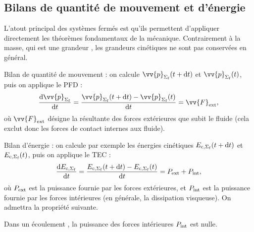 \documentclass[12pt,fancy]{cours}
\begin{document}


\subsection{Bilans de quantité de mouvement et d'énergie}
L’atout principal des systèmes fermés est qu'ils permettent d’appliquer directement les théorèmes fondamentaux de la mécanique.
Contrairement à la masse, qui est une grandeur , les grandeurs cinétiques ne sont pas conservées en général.

\begin{liste}
\item Bilan de quantité de mouvement : on calcule $\vv{p}_{\Sf}(t+\d t)$ et $\vv{p}_{\Sf}(t)$, puis on applique le PFD :
\begin{equation}
\frac{\d\vv{p}_{\Sf}}{\d t}=\frac{\vv{p}_{\Sf}(t+\d t)-\vv{p}_{\Sf}(t)}{\d t}=\vv{F}_{\rm ext},
\end{equation}
où $\vv{F}_{\rm ext}$ désigne la résultante des forces extérieures que subit le fluide (cela exclut donc les forces de contact internes aux fluide).
\item Bilan d’énergie : on calcule par exemple les énergies cinétiques $E_{\rm c,\Sigma_{\rm f}}(t+\mathrm{d} t)$ et $E_{\rm c,\Sigma_{\rm f}}(t)$, puis on applique le TEC :
\begin{equation}
\frac{\mathrm{d} E_{\rm{c},\Sigma_{\rm f}}}{\mathrm{d} t}=\frac{E_{\rm{c},\Sigma_{\rm f}}(t+\mathrm{d} t)-E_{\rm{c},\Sigma_{\rm f}}(t)}{\mathrm{d} t}=P_{\rm{ext}}+P_{\rm{int}},
\end{equation}
où $P_{\rm{ext}}$ est la puissance fournie par les forces extérieures, et $P_{\rm{int}}$ est la puissance fournie par les forces intérieures (en générale, la dissipation visqueuse).
On admettra la propriété suivante.
\begin{prop}\label{prop:}
Dans un écoulement , la puissance des forces intérieures $P_{\rm{int}}$ est nulle.
\end{prop}


\end{liste}
\end{document}
